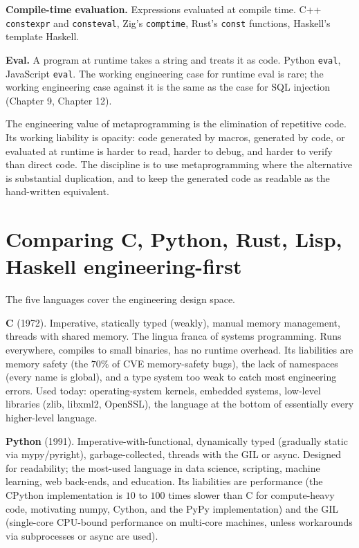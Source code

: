 \textbf{Compile-time evaluation.} Expressions evaluated at compile time. C++ \texttt{constexpr} and \texttt{consteval}, Zig's \texttt{comptime}, Rust's \texttt{const} functions, Haskell's template Haskell.

\textbf{Eval.} A program at runtime takes a string and treats it as code. Python \texttt{eval}, JavaScript \texttt{eval}. The working engineering case for runtime eval is rare; the working engineering case against it is the same as the case for SQL injection (Chapter 9, Chapter 12).

The engineering value of metaprogramming is the elimination of repetitive code. Its working liability is opacity: code generated by macros, generated by code, or evaluated at runtime is harder to read, harder to debug, and harder to verify than direct code. The discipline is to use metaprogramming where the alternative is substantial duplication, and to keep the generated code as readable as the hand-written equivalent.

\section{Comparing C, Python, Rust, Lisp, Haskell engineering-first}

The five languages cover the engineering design space.

\textbf{C} (1972). Imperative, statically typed (weakly), manual memory management, threads with shared memory. The lingua franca of systems programming. Runs everywhere, compiles to small binaries, has no runtime overhead. Its liabilities are memory safety (the $70\%$ of CVE memory-safety bugs), the lack of namespaces (every name is global), and a type system too weak to catch most engineering errors. Used today: operating-system kernels, embedded systems, low-level libraries (zlib, libxml2, OpenSSL), the language at the bottom of essentially every higher-level language.

\textbf{Python} (1991). Imperative-with-functional, dynamically typed (gradually static via mypy/pyright), garbage-collected, threads with the GIL or async. Designed for readability; the most-used language in data science, scripting, machine learning, web back-ends, and education. Its liabilities are performance (the CPython implementation is $10$ to $100$ times slower than C for compute-heavy code, motivating numpy, Cython, and the PyPy implementation) and the GIL (single-core CPU-bound performance on multi-core machines, unless workarounds via subprocesses or async are used).

